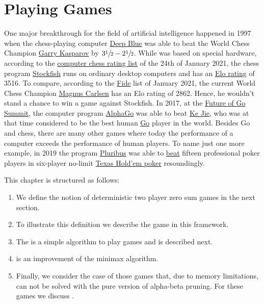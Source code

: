 \chapter{Playing Games}
One major breakthrough for the field of artificial intelligence happened in 1997 when the chess-playing computer
\href{https://en.wikipedia.org/wiki/Deep_Blue_(chess_computer)}{Deep Blue} was able to beat the World Chess
Champion \href{https://en.wikipedia.org/wiki/Garry_Kasparov}{Garry Kasparov} by $3\sfrac{1}{2}-2\sfrac{1}{2}$.
While   was based on special hardware, according to the
\href{http://www.computerchess.org.uk/ccrl/4040/rating_list_all.html}{computer chess rating list} of the 24th
of January 2021, the chess program \href{https://en.wikipedia.org/wiki/Stockfish_(chess)}{Stockfish} runs
on ordinary desktop computers and has an \href{https://en.wikipedia.org/wiki/Elo_rating_system}{Elo rating} of 3516.  
To compare, according to the
\href{https://ratings.fide.com/top.phtml?list=men}{Fide} list of January 2021, the current 
World Chess Champion \href{https://en.wikipedia.org/wiki/Magnus_Carlsen}{Magnus Carlsen} has an Elo rating of
2862.  Hence, he wouldn't stand a chance to win a game against Stockfish.  In 2017, at the 
\href{https://en.wikipedia.org/wiki/Future_of_Go_Summit}{Future of Go Summit},  the computer program
\href{https://en.wikipedia.org/wiki/AlphaGo}{AlphaGo}  was able to beat
\href{https://en.wikipedia.org/wiki/Ke_Jie}{Ke Jie},  
who was at that time considered to be the best human
\href{https://en.wikipedia.org/wiki/Go_(game)}{Go} player in the world. 
Besides Go and chess, there are many other games where today the performance of a computer exceeds the
performance of human players.  To name just one more example, in 2019 the program
\href{https://en.wikipedia.org/wiki/Pluribus_(poker_bot)}{Pluribus}  was able to  
\href{https://arstechnica.com/science/2019/07/facebook-ai-pluribus-defeats-top-poker-professionals-in-6-player-texas-holdem/}{beat}
fifteen professional poker players in six-player no-limit 
\href{https://en.wikipedia.org/wiki/Texas_hold_%27em}{Texas Hold'em poker} resoundingly.

This chapter is structured as follows:
\begin{enumerate}
\item We define the notion of deterministic two player zero sum games in the next section.
\item To illustrate this definition we describe the game  in this framework.
\item The  is a simple algorithm to play games and is described next.
\item {} is an improvement of the minimax algorithm.
\item Finally, we consider the case of those games that, due to memory limitations, can not be solved
      with the pure version of alpha-beta pruning.  For these games we discuss . 
\end{enumerate}

